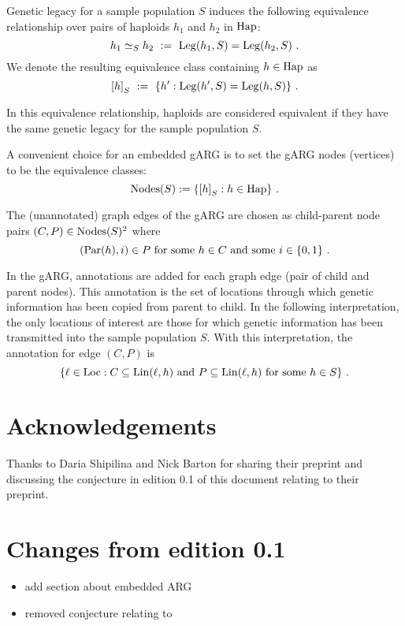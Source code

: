 Genetic legacy for a sample population $S$ induces the following
equivalence relationship over pairs of haploids $h_1$ and $h_2$ in
$\mathrm{Hap}$:
$$
h_1 \simeq_S h_2 \ := \ \mathrm{Leg}(h_1, S) = \mathrm{Leg}(h_2, S)
\text{ .}
$$
We denote the resulting equivalence class containing $h \in \mathrm{Hap}$ as
$$
{[h]}_S \ := \ \{ h' : \mathrm{Leg}(h', S) = \mathrm{Leg}(h, S) \}
\text{ .}
$$

In this equivalence relationship, haploids are considered equivalent if
they have the same genetic legacy for the sample population $S$.

A convenient choice for an embedded gARG \cite{wong_what_arg_2022} is
to set the gARG nodes (vertices) to be the equivalence classes:
$$
   \mathrm{Nodes}(S) := \{ {[h]}_S : h \in \mathrm{Hap} \}
\text{ .}
$$

The (unannotated) graph edges of the gARG are chosen as child-parent
node pairs $(C, P) \in \mathrm{Nodes}(S)^2$ where
$$
  (\mathrm{Par}(h), i) \in P \text{ for some $h \in C$ and some $i \in \{0, 1\}$ .}
$$

In the gARG, annotations are added for each graph edge (pair of child
and parent nodes). This annotation is the set of locations through which
genetic information has been copied from parent to child. In the
following interpretation, the only locations of interest are those for
which genetic information has been transmitted into the sample
population $S$. With this interpretation, the annotation for edge
$(C,P)$ is
$$
  \{ \ell \in \mathrm{Loc} :
     C \subseteq \mathrm{Lin}(\ell, h) \text{ and } P \subseteq \mathrm{Lin}(\ell, h) \text{ for some $h \in S$}
  \}
\text{ .}
$$

\section{Acknowledgements}

Thanks to Daria Shipilina and Nick Barton for sharing their preprint
\cite{shipilina_origin_2022} and discussing the conjecture in edition
0.1 of this document relating to their preprint.

\section{Changes from edition 0.1}

\begin{itemize}
\item
  add section about embedded ARG
\item
  removed conjecture relating to \cite{shipilina_origin_2022}
\end{itemize}


\printbibliography %

